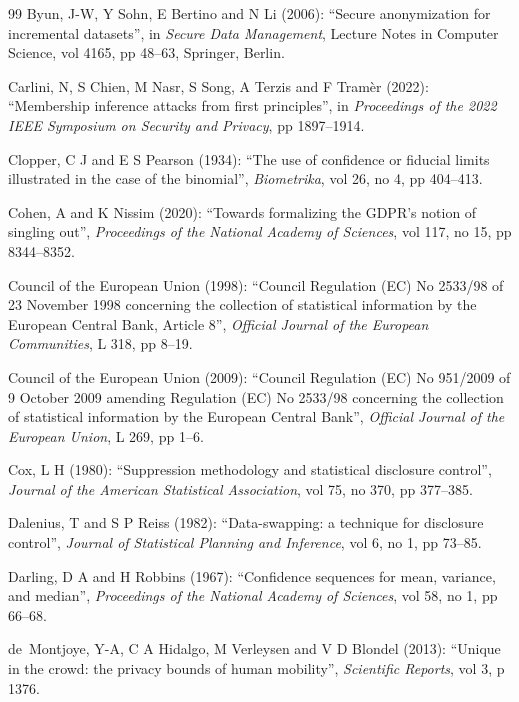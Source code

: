 \documentclass[11pt,a4paper]{article}
\theoremstyle{plain}
\theoremstyle{definition}
\theoremstyle{definition}
\theoremstyle{plain}
\begin{document}
\begin{thebibliography}{99}
Byun, J-W, Y Sohn, E Bertino and N Li (2006): ``Secure anonymization for incremental datasets'', in \emph{Secure Data Management}, Lecture Notes in Computer Science, vol 4165, pp 48--63, Springer, Berlin.

Carlini, N, S Chien, M Nasr, S Song, A Terzis and F Tram\`er (2022): ``Membership inference attacks from first principles'', in \emph{Proceedings of the 2022 IEEE Symposium on Security and Privacy}, pp 1897--1914.

Clopper, C J and E S Pearson (1934): ``The use of confidence or fiducial limits illustrated in the case of the binomial'', \emph{Biometrika}, vol 26, no 4, pp 404--413.

Cohen, A and K Nissim (2020): ``Towards formalizing the GDPR's notion of singling out'', \emph{Proceedings of the National Academy of Sciences}, vol 117, no 15, pp 8344--8352.

Council of the European Union (1998): ``Council Regulation (EC) No 2533/98 of 23 November 1998 concerning the collection of statistical information by the European Central Bank, Article 8'', \emph{Official Journal of the European Communities}, L 318, pp 8--19.

Council of the European Union (2009): ``Council Regulation (EC) No 951/2009 of 9 October 2009 amending Regulation (EC) No 2533/98 concerning the collection of statistical information by the European Central Bank'', \emph{Official Journal of the European Union}, L 269, pp 1--6.

Cox, L H (1980): ``Suppression methodology and statistical disclosure control'', \emph{Journal of the American Statistical Association}, vol 75, no 370, pp 377--385.

Dalenius, T and S P Reiss (1982): ``Data-swapping: a technique for disclosure control'', \emph{Journal of Statistical Planning and Inference}, vol 6, no 1, pp 73--85.

Darling, D A and H Robbins (1967): ``Confidence sequences for mean, variance, and median'', \emph{Proceedings of the National Academy of Sciences}, vol 58, no 1, pp 66--68.

de~Montjoye, Y-A, C A Hidalgo, M Verleysen and V D Blondel (2013): ``Unique in the crowd: the privacy bounds of human mobility'', \emph{Scientific Reports}, vol 3, p 1376.


\end{thebibliography}
\end{document}
